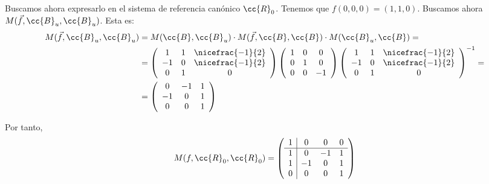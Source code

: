 \begin{ejemplo}
    Buscamos ahora expresarlo en el sistema de referencia canónico $\cc{R}_0$. Tenemos que $f(0,0,0)=(1,1,0)$. Buscamos ahora $M(\vec{f}, \cc{B}_u, \cc{B}_u)$. Esta es:
    \begin{equation*}\begin{split}
        M(\vec{f}, \cc{B}_u, \cc{B}_u) &= M(\cc{B}, \cc{B}_u)\cdot M(\vec{f}, \cc{B}, \cc{B})\cdot M(\cc{B}_u, \cc{B}) =\\&
        = \left(\begin{array}{ccc}
            1 & 1 & \nicefrac{-1}{2}\\
            -1 & 0 & \nicefrac{-1}{2} \\
            0 & 1 & 0\\
        \end{array}\right)
        \left(\begin{array}{ccc}
            1 & 0 & 0\\
            0 & 1 & 0 \\
            0 & 0 & -1\\
        \end{array}\right)
        \left(\begin{array}{ccc}
            1 & 1 & \nicefrac{-1}{2}\\
            -1 & 0 & \nicefrac{-1}{2} \\
            0 & 1 & 0\\
        \end{array}\right)^{-1} =\\&=
        \left(\begin{array}{ccc}
            0 & -1 & 1\\
            -1 & 0 & 1 \\
            0 & 0 & 1\\
        \end{array}\right)
    \end{split}\end{equation*}

    Por tanto,
    \begin{equation*}
        M(f,\cc{R}_0,\cc{R}_0) = \left(\begin{array}{c|ccc}
        1 & 0 & 0 & 0 \\ \hline
        1 & 0 & -1 & 1\\
        1 & -1 & 0 & 1\\
        0 & 0 & 0 & 1\\
    \end{array}\right)
    \end{equation*}
    
\end{ejemplo}



